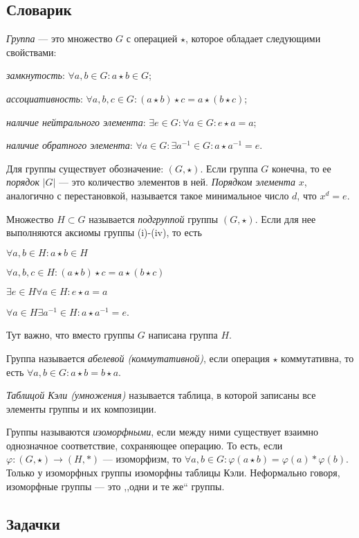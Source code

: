 \documentclass[10pt]{article}
\begin{document}
\subsection*{Словарик}

\begin{bullets}
    \item \emph{Группа} --- это множество $G$ с операцией $\star$, которое обладает следующими свойствами: 
    \begin{conditions}
        \item \textit{замкнутость}: $\forall a, b \in G \colon a \star b \in G$;
        \item \textit{ассоциативность}: $\forall a, b, c \in G \colon (a \star b) \star c = a \star (b \star c)$;
        \item \textit{наличие нейтрального элемента}: $\exists e \in G \colon \forall a \in G: e \star a = a$;
        \item \textit{наличие обратного элемента}: $\forall a \in G \colon \exists a^{-1} \in G: a \star a^{-1} = e$.
    \end{conditions}

\item Для группы существует обозначение: $(G, \star)$. Если группа $G$ конечна, то ее \emph{порядок} $|G|$ --- это количество элементов в ней.
\emph{Порядком элемента} $x$, аналогично с перестановкой, называется такое минимальное число $d$, что $x^d = e$.

\item Множество $H \subset G$ называется \emph{подгруппой} группы $(G, \star)$. Если для нее выполняются аксиомы группы (i)-(iv), то есть \begin{inumerate}[(i)]
        \item $\forall a, b \in H \colon a \star b \in H$
        \item $\forall a, b, c \in H \colon (a \star b) \star c = a \star (b \star c)$
        \item $\exists e \in H \forall a \in H \colon e \star a = a$
        \item $\forall a \in H  \exists a^{-1} \in H \colon a \star a^{-1} = e$. 
\end{inumerate}
Тут важно, что вместо группы $G$ написана группа $H$.

\item Группа называется \emph{абелевой (коммутативной)}, если операция $\star$ коммутативна, то есть $\forall a, b \in G \colon a \star b = b \star a$.

\item \emph{Таблицой Кэли (умножения)} называется таблица, в которой записаны все элементы группы и их композиции. 

\item Группы называются \emph{изоморфными}, если между ними существует взаимно однозначное соответствие, сохраняющее операцию. То есть, если $\varphi: (G, \star) \to (H, *)$ --- изоморфизм, то $\forall a, b \in G: \varphi(a \star b) = \varphi(a) * \varphi(b)$. Только у изоморфных группы изоморфны таблицы Кэли. Неформально говоря, изоморфные группы --- это ,,одни и те же`` группы.
\end{bullets}

\subsection*{Задачки}

\end{document}
